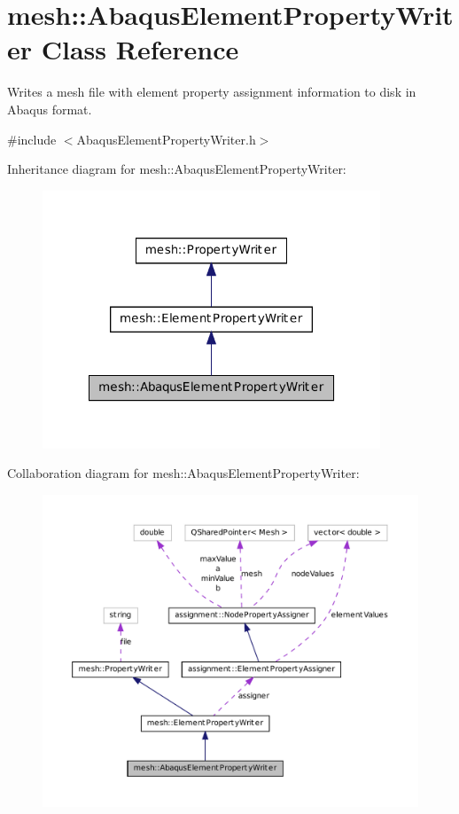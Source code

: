 \hypertarget{classmesh_1_1_abaqus_element_property_writer}{
\section{mesh::AbaqusElementPropertyWriter Class Reference}
\label{classmesh_1_1_abaqus_element_property_writer}
}


Writes a mesh file with element property assignment information to disk in Abaqus format.  




{\ttfamily \#include $<$AbaqusElementPropertyWriter.h$>$}



Inheritance diagram for mesh::AbaqusElementPropertyWriter:\nopagebreak
\begin{figure}[H]
\begin{center}
\leavevmode
\includegraphics[width=286pt]{classmesh_1_1_abaqus_element_property_writer__inherit__graph}
\end{center}
\end{figure}


Collaboration diagram for mesh::AbaqusElementPropertyWriter:\nopagebreak
\begin{figure}[H]
\begin{center}
\leavevmode
\includegraphics[width=400pt]{classmesh_1_1_abaqus_element_property_writer__coll__graph}
\end{center}
\end{figure}
